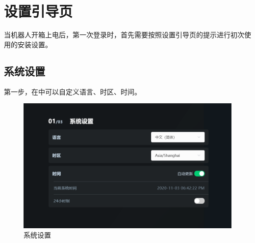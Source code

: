\clearpage

\section{设置引导页}

当机器人开箱上电后，第一次登录\LM 时，首先需要按照设置引导页的提示进行初次使用的安装设置。
\subsection{系统设置}
第一步，在中可以自定义语言、时区、时间。

\begin{figure}[ht]
    \centering
    \includegraphics[width=\textwidth]{screen/2-5.png}
    \caption{系统设置}
    \label{fig:系统设置}
\end{figure}


